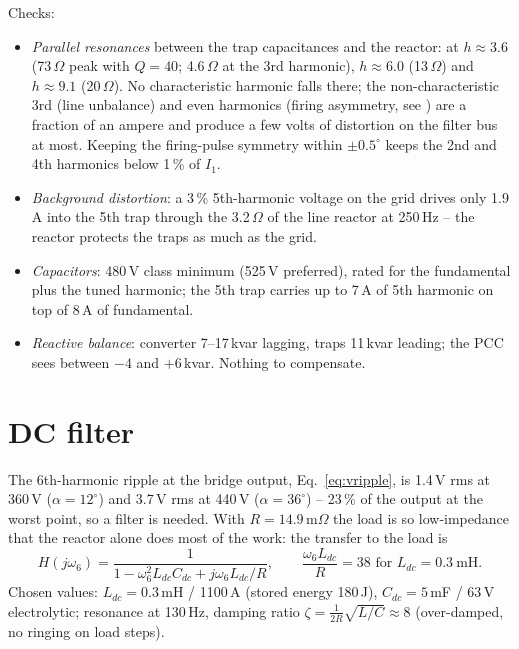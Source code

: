 \documentclass[11pt,a4paper]{article}
\begin{document}
Checks:
\begin{itemize}
\item \emph{Parallel resonances} between the trap capacitances and the reactor: at $h \approx 3.6$ (73\,$\Omega$ peak with $Q = 40$; 4.6\,$\Omega$ at the 3rd harmonic), $h \approx 6.0$ (13\,$\Omega$) and $h \approx 9.1$ (20\,$\Omega$). No characteristic harmonic falls there; the non-characteristic 3rd (line unbalance) and even harmonics (firing asymmetry, see \cite{even}) are a fraction of an ampere and produce a few volts of distortion on the filter bus at most. Keeping the firing-pulse symmetry within $\pm0.5^\circ$ keeps the 2nd and 4th harmonics below 1\,\% of $I_1$.
\item \emph{Background distortion}: a 3\,\% 5th-harmonic voltage on the grid drives only 1.9\,A into the 5th trap through the 3.2\,$\Omega$ of the line reactor at 250\,Hz -- the reactor protects the traps as much as the grid.
\item \emph{Capacitors}: 480\,V class minimum (525\,V preferred), rated for the fundamental plus the tuned harmonic; the 5th trap carries up to 7\,A of 5th harmonic on top of 8\,A of fundamental.
\item \emph{Reactive balance}: converter 7--17\,kvar lagging, traps 11\,kvar leading; the PCC sees between $-4$ and $+6$\,kvar. Nothing to compensate.
\end{itemize}

\section{DC filter}
\label{sec:dcfilter}

The 6th-harmonic ripple at the bridge output, Eq.~\eqref{eq:vripple}, is 1.4\,V rms at 360\,V ($\alpha = 12^\circ$) and 3.7\,V rms at 440\,V ($\alpha = 36^\circ$) -- 23\,\% of the output at the worst point, so a filter is needed. With $R = 14.9$\,m$\Omega$ the load is so low-impedance that the reactor alone does most of the work: the transfer to the load is
\[
H(j\omega_6) = \frac{1}{1 - \omega_6^2L_{dc}C_{dc} + j\omega_6L_{dc}/R}, \qquad \frac{\omega_6 L_{dc}}{R} = 38 \text{ for } L_{dc} = 0.3\ \text{mH}.
\]
Chosen values: $L_{dc} = 0.3$\,mH / 1100\,A (stored energy 180\,J), $C_{dc} = 5$\,mF / 63\,V electrolytic; resonance at 130\,Hz, damping ratio $\zeta = \tfrac{1}{2R}\sqrt{L/C} \approx 8$ (over-damped, no ringing on load steps).

\begin{table}[h]
\centering

\caption{DC-side 6th-harmonic ripple with $L_{dc} = 0.3$\,mH, $C_{dc} = 5$\,mF.}
\label{tab:dc}
\end{table}
\end{document}
